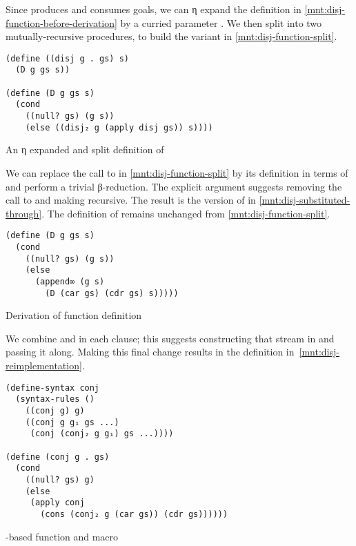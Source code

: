 \documentclass[sigplan,draft,balance,pbalance,natbib=false]{acmart}
\begin{document}
\noindent Since  produces and consumes goals, we can
η expand the definition in \cref{mnt:disj-function-before-derivation}
by a curried parameter . We then split 
into two mutually-recursive procedures, to build the variant in
\cref{mnt:disj-function-split}.

\begin{listing}[h]
\begin{verbatim}
(define ((disj g . gs) s)
  (D g gs s))

(define (D g gs s)
  (cond
    ((null? gs) (g s))
    (else ((disj₂ g (apply disj gs)) s))))
\end{verbatim}
  \caption{An η expanded and split definition of }
  \label{mnt:disj-function-split}
\end{listing}

\noindent We can replace the call to  in
\cref{mnt:disj-function-split} by its definition in terms of
 and perform a trivial β-reduction. The explicit
 argument suggests removing the call to
 and making  recursive. The result is
the version of  in \cref{mnt:disj-substituted-through}.
The definition of  remains unchanged from
\cref{mnt:disj-function-split}.

\begin{listing}[h]
\begin{verbatim}
(define (D g gs s)
  (cond
    ((null? gs) (g s))
    (else
      (append∞ (g s)
        (D (car gs) (cdr gs) s)))))
\end{verbatim}
  \caption{Derivation of  function definition}
  \label{mnt:disj-substituted-through}
\end{listing}

\noindent We combine  and  in each clause;
this suggests constructing that stream in  and
passing it along. Making this final change results in the definition
in~\cref{mnt:disj-reimplementation}.


\begin{listing}[h]
\begin{verbatim}
(define-syntax conj
  (syntax-rules ()
    ((conj g) g)
    ((conj g g₁ gs ...)
     (conj (conj₂ g g₁) gs ...))))

(define (conj g . gs)
  (cond
    ((null? gs) g)
    (else
     (apply conj
       (cons (conj₂ g (car gs)) (cdr gs))))))
\end{verbatim}
  \caption{-based  function and macro}
  \label{mnt:conj-function-derived-definition}
\end{listing}
\end{document}

